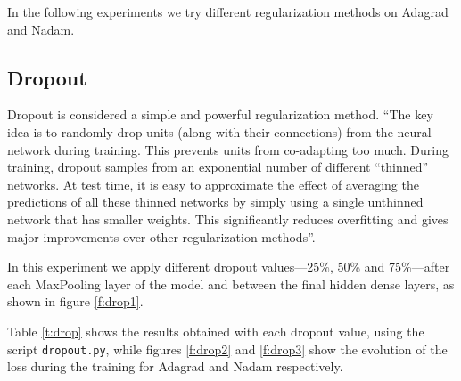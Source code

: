 \documentclass[]{article}
\begin{document}
In the following experiments we try different regularization methods on Adagrad and Nadam.

\subsection{Dropout}

Dropout is considered a simple and powerful regularization method. \cite{srivastava2014dropout} ``The key idea is to randomly drop units (along with their connections) from the neural network during training. This prevents units from co-adapting too much. During training, dropout samples from an exponential number of different ``thinned'' networks. At test time, it is easy to approximate the effect of averaging the predictions of all these thinned networks by simply using a single unthinned network that has smaller weights. This significantly reduces overfitting and gives major improvements over other regularization methods''.

In this experiment we apply different dropout values---25\%, 50\% and 75\%---after each MaxPooling layer of the model and between the final hidden dense layers, as shown in figure \ref{f:drop1}.

Table \ref{t:drop} shows the results obtained with each dropout value, using the script \texttt{dropout.py}, while figures \ref{f:drop2} and \ref{f:drop3} show the evolution of the loss during the training for Adagrad and Nadam respectively.
\end{document}
